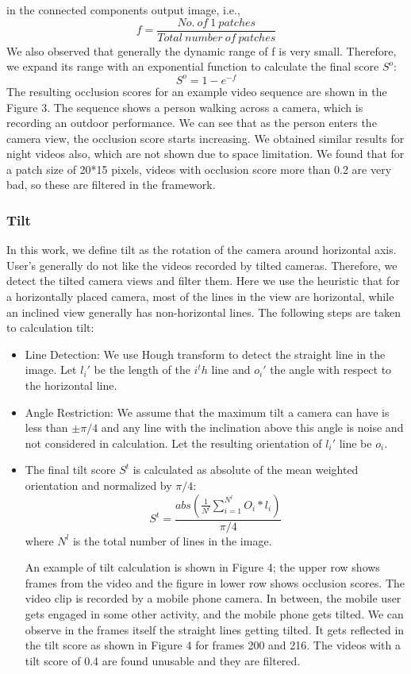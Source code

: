 \documentclass{sig-alternate}
\begin{document}
\begin{itemize}
in the connected components output image, i.e.,
\[f = \frac{No.\ of\ 1\ patches}{Total\ number\ of\ patches}\tag{4}\]
We also observed that generally the dynamic range of f is very
small. Therefore, we expand its range with an exponential function
to calculate the final score $S^o$:
\[S^o = 1 - e^ {-f}\tag{5}\]
The resulting occlusion scores for an example video sequence
are shown in the Figure 3. The sequence shows a person walking
across a camera, which is recording an outdoor performance. We
can see that as the person enters the camera view, the occlusion
score starts increasing. We obtained similar results for night videos
also, which are not shown due to space limitation. We found that
for a patch size of 20*15 pixels, videos with occlusion score more
than 0.2 are very bad, so these are filtered in the framework.
\end{itemize}

\subsubsection{Tilt}
In this work, we define tilt as the rotation of the camera around
horizontal axis. User’s generally do not like the videos recorded
by tilted cameras. Therefore, we detect the tilted camera views
and filter them. Here we use the heuristic that for a horizontally
placed camera, most of the lines in the view are horizontal, while
an inclined view generally has non-horizontal lines. The following
steps are taken to calculation tilt:
\begin{itemize}
\item Line Detection: We use Hough transform to detect the straight
line in the image. Let $l_i'$ be the length of the $i^th$ line and $o_i'$
the angle with respect to the horizontal line.
\item Angle Restriction: We assume that the maximum tilt a camera can
have is less than $\pm \pi/4$
and any line with the inclination above this angle is
noise and not considered in calculation.
Let the resulting orientation of $l_i'$ line be $o_i$.
\item The final tilt score $S^t$ is calculated as absolute of the mean
weighted orientation and normalized by $\pi/4$:
\[S^t = \frac{abs\left ( \frac{1}{N^l}\sum_{i=1}^{N^l}O_i*l_i \right )}{\pi/4}\tag{6}\]
where $N^l$ is the total number of lines in the image.


An example of tilt calculation is shown in Figure 4; the upper
row shows frames from the video and the figure in lower row shows
occlusion scores. The video clip is recorded by a mobile phone
camera. In between, the mobile user gets engaged in some other
activity, and the mobile phone gets tilted. We can observe in the
frames itself the straight lines getting tilted. It gets reflected in the
tilt score as shown in Figure 4 for frames 200 and 216. The videos
with a tilt score of 0.4 are found unusable and they are filtered.
\end{itemize}
\end{document}
